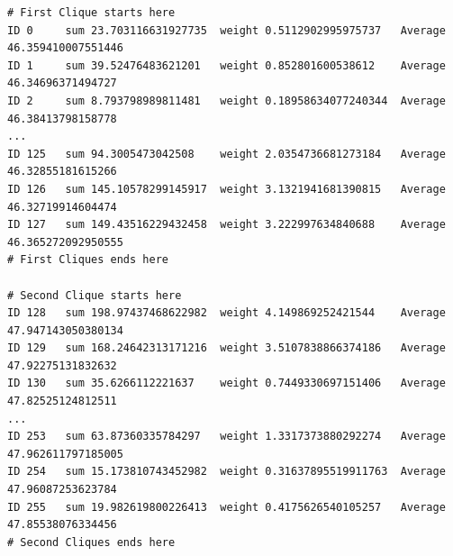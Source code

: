 \begin{lstlisting}[caption=Snippet of simulation outcomes ATPPS: Experiment 2, captionpos=b, label=lst:exampleROCOutcomes]
# First Clique starts here
ID 0	 sum 23.703116631927735	 weight 0.5112902995975737	 Average 46.359410007551446
ID 1	 sum 39.52476483621201	 weight 0.852801600538612	 Average 46.34696371494727
ID 2	 sum 8.793798989811481	 weight 0.18958634077240344	 Average 46.38413798158778
...
ID 125	 sum 94.3005473042508	 weight 2.0354736681273184	 Average 46.32855181615266
ID 126	 sum 145.10578299145917	 weight 3.1321941681390815	 Average 46.32719914604474
ID 127	 sum 149.43516229432458	 weight 3.222997634840688	 Average 46.365272092950555
# First Cliques ends here

# Second Clique starts here
ID 128	 sum 198.97437468622982	 weight 4.149869252421544	 Average 47.947143050380134
ID 129	 sum 168.24642313171216	 weight 3.5107838866374186	 Average 47.92275131832632
ID 130	 sum 35.6266112221637	 weight 0.7449330697151406	 Average 47.82525124812511
...
ID 253	 sum 63.87360335784297	 weight 1.3317373880292274	 Average 47.962611797185005
ID 254	 sum 15.173810743452982	 weight 0.31637895519911763	 Average 47.96087253623784
ID 255	 sum 19.982619800226413	 weight 0.4175626540105257	 Average 47.85538076334456
# Second Cliques ends here
\end{lstlisting}
